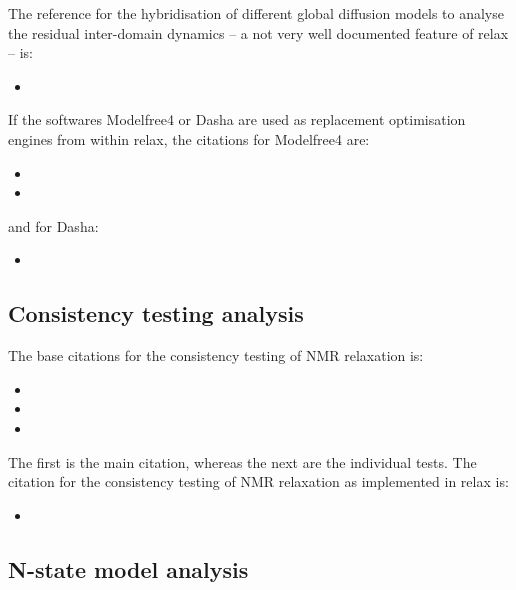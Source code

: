 The reference for the hybridisation of different global diffusion models to analyse the residual inter-domain dynamics -- a not very well documented feature of relax -- is:

\begin{itemize}
\item {}
\end{itemize}

If the softwares Modelfree4 or Dasha are used as replacement optimisation engines from within relax, the citations for Modelfree4 are:

\begin{itemize}
\item {}
\item {}
\end{itemize}

and for Dasha:

\begin{itemize}
\item {}
\end{itemize}



\subsection{Consistency testing analysis}

The base citations for the consistency testing of NMR relaxation is:

\begin{itemize}
\item {}
\item {}
\item {}
\end{itemize}

The first is the main citation, whereas the next are the individual tests.  The citation for the consistency testing of NMR relaxation as implemented in relax is:

\begin{itemize}
\item {}
\end{itemize}



\subsection{N-state model analysis}

